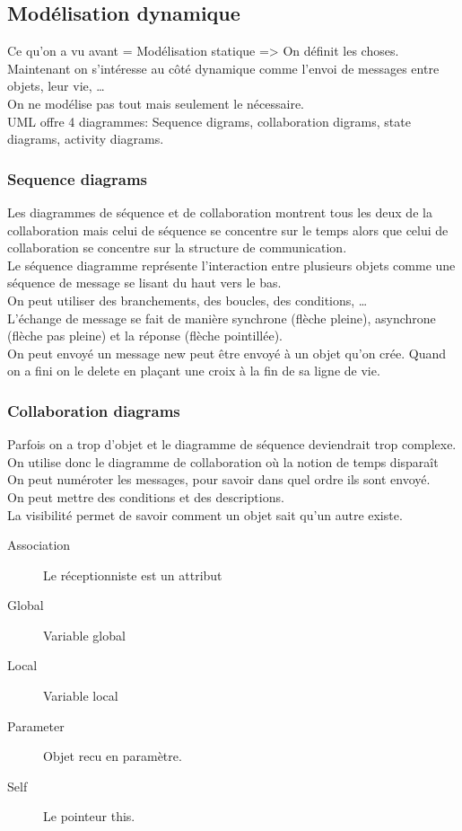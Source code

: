 \subsection{Modélisation dynamique}
Ce qu’on a vu avant = Modélisation statique => On définit les choses.
\\Maintenant on s’intéresse au côté dynamique comme l’envoi de messages entre objets, leur vie, …
\\On ne modélise pas tout mais seulement le nécessaire.
\\UML offre 4 diagrammes: Sequence digrams, collaboration digrams, state diagrams, activity diagrams.

\subsubsection{Sequence diagrams}
Les diagrammes de séquence et de collaboration montrent tous les deux de la collaboration mais celui de séquence se concentre sur le temps alors que celui de collaboration se concentre sur la structure de communication.
\\Le séquence diagramme représente l'interaction entre plusieurs objets comme une séquence de message se lisant du haut vers le bas.
\\On peut utiliser des branchements, des boucles, des conditions, …
\\L’échange de message se fait de manière synchrone (flèche pleine), asynchrone (flèche pas pleine) et la réponse (flèche pointillée).
\\On peut envoyé un message new peut être envoyé à un objet qu’on crée. Quand on a fini on le delete en plaçant une croix à la fin de sa ligne de vie.

\subsubsection{Collaboration diagrams}
Parfois on a trop d’objet et le diagramme de séquence deviendrait trop complexe.
\\On utilise donc le diagramme de collaboration où la notion de temps disparaît
\\On peut numéroter les messages, pour savoir dans quel ordre ils sont envoyé.
\\On peut mettre des conditions et des descriptions.
\\La visibilité permet de savoir comment un objet sait qu’un autre existe.

\begin{description}
	\item [Association] Le réceptionniste est un attribut
	\item [Global] Variable global
	\item [Local] Variable local
	\item [Parameter] Objet recu en paramètre.
	\item [Self] Le pointeur this.
\end{description}